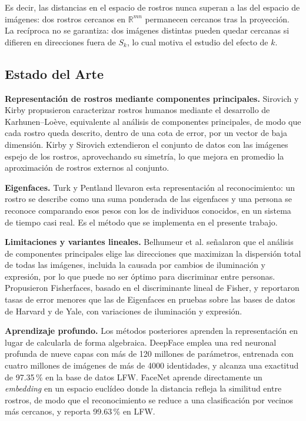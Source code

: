 Es decir, las distancias en el espacio de rostros nunca superan a las del espacio de
imágenes: dos rostros cercanos en $\mathbb{R}^{mn}$ permanecen cercanos tras la
proyección. La recíproca no se garantiza: dos imágenes distintas pueden quedar cercanas
si difieren en direcciones fuera de $S_k$, lo cual motiva el estudio del efecto de $k$.


\subsection{Estado del Arte}
 
\textbf{Representación de rostros mediante componentes principales.}
Sirovich y Kirby \cite{sirovich1987low} propusieron caracterizar rostros humanos
mediante el desarrollo de Karhunen--Loève, equivalente al análisis de componentes
principales, de modo que cada rostro queda descrito, dentro de una cota de error,
por un vector de baja dimensión. Kirby y Sirovich \cite{kirby1990application}
extendieron el conjunto de datos con las imágenes espejo de los rostros, aprovechando
su simetría, lo que mejora en promedio la aproximación de rostros externos al conjunto.
 
\textbf{Eigenfaces.} Turk y Pentland \cite{turk1991eigenfaces} llevaron esta
representación al reconocimiento: un rostro se describe como una suma ponderada de
las eigenfaces y una persona se reconoce comparando esos pesos con los de individuos
conocidos, en un sistema de tiempo casi real. Es el método que se implementa en el
presente trabajo.
 
\textbf{Limitaciones y variantes lineales.} Belhumeur et al.
\cite{belhumeur1997eigenfaces} señalaron que el análisis de componentes principales
elige las direcciones que maximizan la dispersión total de todas las imágenes,
incluida la causada por cambios de iluminación y expresión, por lo que puede no ser
óptimo para discriminar entre personas. Propusieron Fisherfaces, basado en el
discriminante lineal de Fisher, y reportaron tasas de error menores que las de
Eigenfaces en pruebas sobre las bases de datos de Harvard y de Yale, con variaciones
de iluminación y expresión.
 
\textbf{Aprendizaje profundo.} Los métodos posteriores aprenden la representación
en lugar de calcularla de forma algebraica. DeepFace \cite{taigman2014deepface}
emplea una red neuronal profunda de nueve capas con más de 120 millones de parámetros,
entrenada con cuatro millones de imágenes de más de 4000 identidades, y alcanza
una exactitud de 97.35\,\% en la base de datos LFW. FaceNet \cite{schroff2015facenet}
aprende directamente un \textit{embedding} en un espacio euclídeo donde la distancia
refleja la similitud entre rostros, de modo que el reconocimiento se reduce a una
clasificación por vecinos más cercanos, y reporta 99.63\,\% en LFW.
 
